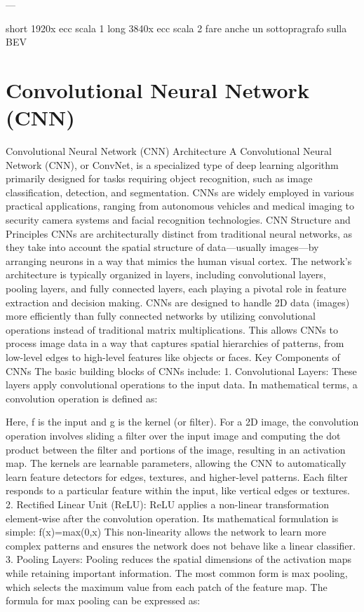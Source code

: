 ---

short 1920x ecc scala 1
long  3840x ecc scala 2
fare anche un sottopragrafo sulla BEV






\section{Convolutional Neural Network (CNN)}

Convolutional Neural Network (CNN) Architecture
A Convolutional Neural Network (CNN), or ConvNet, is a specialized type of deep learning algorithm primarily designed for tasks requiring object recognition, such as image classification, detection, and segmentation. CNNs are widely employed in various practical applications, ranging from autonomous vehicles and medical imaging to security camera systems and facial recognition technologies.
CNN Structure and Principles
CNNs are architecturally distinct from traditional neural networks, as they take into account the spatial structure of data—usually images—by arranging neurons in a way that mimics the human visual cortex. The network's architecture is typically organized in layers, including convolutional layers, pooling layers, and fully connected layers, each playing a pivotal role in feature extraction and decision making.
CNNs are designed to handle 2D data (images) more efficiently than fully connected networks by utilizing convolutional operations instead of traditional matrix multiplications. This allows CNNs to process image data in a way that captures spatial hierarchies of patterns, from low-level edges to high-level features like objects or faces.
Key Components of CNNs
The basic building blocks of CNNs include:
    1. Convolutional Layers: These layers apply convolutional operations to the input data. In mathematical terms, a convolution operation is defined as:
      
       Here, f is the input and g is the kernel (or filter). For a 2D image, the convolution operation involves sliding a filter over the input image and computing the dot product between the filter and portions of the image, resulting in an activation map. The kernels are learnable parameters, allowing the CNN to automatically learn feature detectors for edges, textures, and higher-level patterns. Each filter responds to a particular feature within the input, like vertical edges or textures.
    2. Rectified Linear Unit (ReLU): ReLU applies a non-linear transformation element-wise after the convolution operation. Its mathematical formulation is simple:
       f(x)=max(0,x)
       This non-linearity allows the network to learn more complex patterns and ensures the network does not behave like a linear classifier.
    3. Pooling Layers: Pooling reduces the spatial dimensions of the activation maps while retaining important information. The most common form is max pooling, which selects the maximum value from each patch of the feature map. The formula for max pooling can be expressed as:
      
